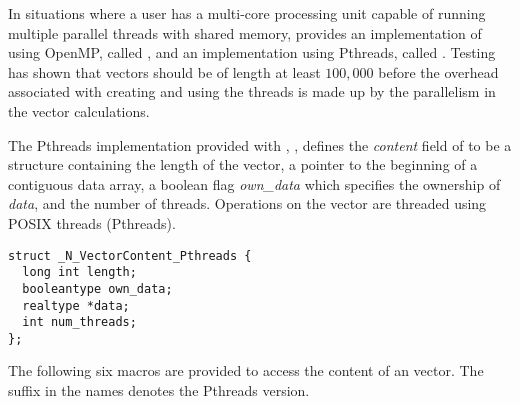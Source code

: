 
In situations where a user has a multi-core processing unit capable of
running multiple parallel threads with shared memory, {\sundials} provides
an implementation of {\nvector} using OpenMP, called {\nvecopenmp}, and
an implementation using Pthreads, called {\nvecpthreads}.  
Testing has shown that vectors should be of length at least $100,000$ 
before the overhead associated with creating and using the threads is
made up by the parallelism in the vector calculations. 

The Pthreads {\nvector} implementation provided with {\sundials},
{\nvecpthreads}, defines the {\em content} field of  to be a structure 
containing the length of the vector, a pointer to the beginning of a contiguous 
data array, a boolean flag {\em own\_data} which specifies the ownership 
of {\em data}, and the number of threads.  
Operations on the vector are threaded using POSIX threads 
(Pthreads).
\begin{verbatim} 
struct _N_VectorContent_Pthreads {
  long int length;
  booleantype own_data;
  realtype *data;
  int num_threads;
};
\end{verbatim}
The following six macros are provided to access the content of an {\nvecpthreads}
vector. The suffix  in the names denotes the Pthreads version.
